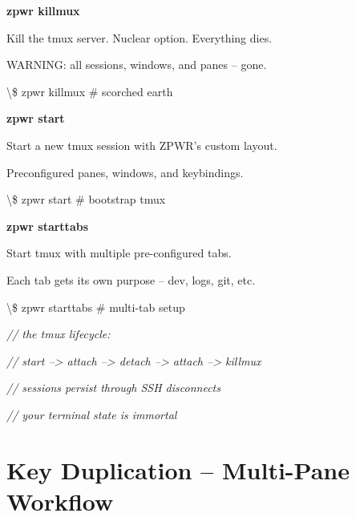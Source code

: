 \documentclass[11pt,a4paper,twoside]{book}
\begin{document}
\vspace{12pt}
{\bfseries\color{neonyellow} zpwr killmux}\vspace{4pt}

Kill the tmux server. Nuclear option. Everything dies.

WARNING: all sessions, windows, and panes -- gone.

\begin{codebox}
\textbackslash{}\$ zpwr killmux                \# scorched earth\\
\end{codebox}


\vspace{12pt}
{\bfseries\color{neonyellow} zpwr start}\vspace{4pt}

Start a new tmux session with ZPWR's custom layout.

Preconfigured panes, windows, and keybindings.

\begin{codebox}
\textbackslash{}\$ zpwr start                  \# bootstrap tmux\\
\end{codebox}


\vspace{12pt}
{\bfseries\color{neonyellow} zpwr starttabs}\vspace{4pt}

Start tmux with multiple pre-configured tabs.

Each tab gets its own purpose -- dev, logs, git, etc.

\begin{codebox}
\textbackslash{}\$ zpwr starttabs              \# multi-tab setup\\
\end{codebox}

{\small\itshape\color{dimtext} // the tmux lifecycle:}

{\small\itshape\color{dimtext} //   start --> attach --> detach --> attach --> killmux}

{\small\itshape\color{dimtext} //   sessions persist through SSH disconnects}

{\small\itshape\color{dimtext} //   your terminal state is immortal}


\vspace{16pt}

\section{Key Duplication -- Multi-Pane Workflow}
\end{document}
